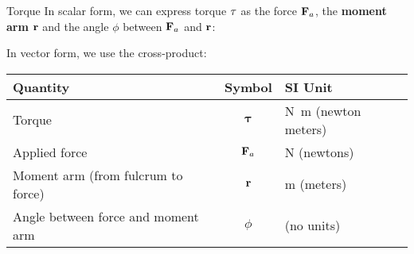 \documentclass[12pt,compress,aspectratio=169]{beamer}
\newcommand{\mb}[1]{\ensuremath\mathbf{#1}}
\newcommand{\eq}[2]{\vspace{#1}{\Large\begin{displaymath}#2\end{displaymath}}}
\begin{document}
\begin{frame}{Torque}
  In scalar form, we can express torque $\mb{\tau}$ as the force $\mb{F}_a$,
  the \textbf{moment arm} $\mb{r}$ and the angle $\phi$ between $\mb{F}_a$ and
  $\mb{r}$:

  \eq{-.2in}{\boxed{\tau=rF_a\sin\phi}}
  
  \vspace{-.1in}In vector form, we use the cross-product:

  \eq{-.2in}{\boxed{\bm{\tau}=\mb{r}\times\mb{F}_a}}

  \begin{center}
    \begin{tabular}{l|c|l}
      \rowcolor{pink}
      \textbf{Quantity} & \textbf{Symbol} & \textbf{SI Unit} \\ \hline
      Torque        & $\bm{\tau}$ & \si{\newton\metre} (newton meters)\\
      Applied force & $\mb{F}_a$  & \si{\newton} (newtons)\\
      Moment arm (from fulcrum to force) & $\mb{r}$ & \si{\metre} (meters) \\
      Angle between force and moment arm & $\phi$ & (no units)
    \end{tabular}
  \end{center}
\end{frame}
\end{document}
